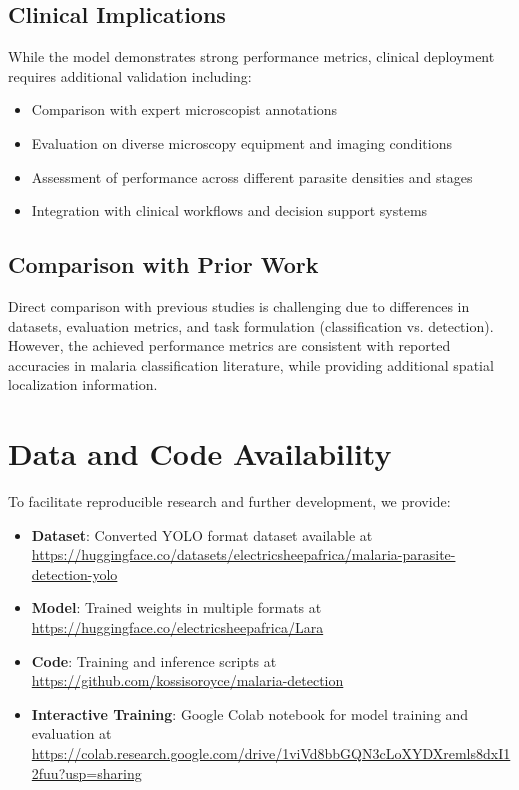 \documentclass[10pt,twocolumn]{article}
\begin{document}
\subsection{Clinical Implications}

While the model demonstrates strong performance metrics, clinical deployment requires additional validation including:
\begin{itemize}
\item Comparison with expert microscopist annotations
\item Evaluation on diverse microscopy equipment and imaging conditions
\item Assessment of performance across different parasite densities and stages
\item Integration with clinical workflows and decision support systems
\end{itemize}

\subsection{Comparison with Prior Work}

Direct comparison with previous studies is challenging due to differences in datasets, evaluation metrics, and task formulation (classification vs. detection). However, the achieved performance metrics are consistent with reported accuracies in malaria classification literature, while providing additional spatial localization information.

\section{Data and Code Availability}

To facilitate reproducible research and further development, we provide:

\begin{itemize}
\item \textbf{Dataset}: Converted YOLO format dataset available at \url{https://huggingface.co/datasets/electricsheepafrica/malaria-parasite-detection-yolo}
\item \textbf{Model}: Trained weights in multiple formats at \url{https://huggingface.co/electricsheepafrica/Lara}
\item \textbf{Code}: Training and inference scripts at \url{https://github.com/kossisoroyce/malaria-detection}
\item \textbf{Interactive Training}: Google Colab notebook for model training and evaluation at \url{https://colab.research.google.com/drive/1viVd8bbGQN3cLoXYDXremls8dxI12fuu?usp=sharing}
\end{itemize}
\end{document}
